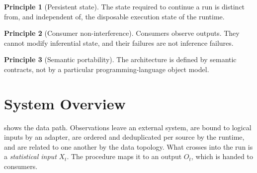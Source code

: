 \documentclass[11pt,a4paper]{article}
\theoremstyle{definition}
\newtheorem{principle}{Principle}
\theoremstyle{remark}
\begin{document}
\begin{principle}[Persistent state]
\label{pr:persistent}
The state required to continue a run is distinct from, and independent
of, the disposable execution state of the runtime.
\end{principle}

\begin{principle}[Consumer non-interference]
\label{pr:consumers}
Consumers observe outputs. They cannot modify inferential state, and
their failures are not inference failures.
\end{principle}

\begin{principle}[Semantic portability]
\label{pr:portability}
The architecture is defined by semantic contracts, not by a particular
programming-language object model.
\end{principle}

\section{System Overview}
\label{sec:architecture}

 shows the data path. Observations leave an
external system, are bound to logical inputs by an adapter, are ordered
and deduplicated per source by the runtime, and are related to one
another by the data topology. What crosses into the run is a
\emph{statistical input} $X_t$. The procedure maps it to an output $O_t$,
which is handed to consumers.
\end{document}

